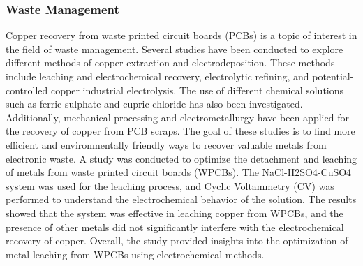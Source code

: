 \documentclass[../report.tex]{subfiles}
\begin{document}
\subsubsection*{Waste Management}
Copper recovery from waste printed circuit boards (PCBs) is a topic of interest in the field of waste management. Several studies have been conducted to explore different methods of copper extraction and electrodeposition. These methods include leaching and electrochemical recovery, electrolytic refining, and potential-controlled copper industrial electrolysis. The use of different chemical solutions such as ferric sulphate and cupric chloride has also been investigated. Additionally, mechanical processing and electrometallurgy have been applied for the recovery of copper from PCB scraps. The goal of these studies is to find more efficient and environmentally friendly ways to recover valuable metals from electronic waste.
A study was conducted \cite{copper_recovery}  to optimize the detachment and leaching of metals from waste printed circuit boards (WPCBs). The NaCl-H2SO4-CuSO4 system was used for the leaching process, and Cyclic Voltammetry (CV) was performed to understand the electrochemical behavior of the solution. The results showed that the system was effective in leaching copper from WPCBs, and the presence of other metals did not significantly interfere with the electrochemical recovery of copper. Overall, the study provided insights into the optimization of metal leaching from WPCBs using electrochemical methods. 
\end{document}
